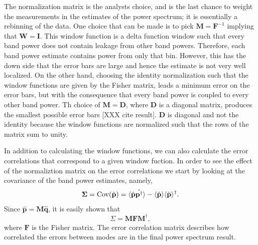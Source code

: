 \documentclass[twocolumn,numberedappendix]{emulateapj} \shorttitle{PSA64}
\newcommand{\phat}{\hat{\mathbf{p}}}
\newcommand{\qhat}{\hat{\mathbf{q}}}
\begin{document}
%
The normalization matrix is the analysts choice, and is the last chance to
weight the measurements in the estimates of the power spectrum; it is
essentially a rebinning of the data. One choice that can be made is to pick
$\mathbf{M} = \mathbf{F}^{-1}$ implying that $\mathbf{W} = \mathbf{I}$. This
window function is a delta function window such that every band power does not
contain leakage from other band powers. Therefore, each band power estimate
contains power from only that bin. However, this has the down side that the
error bars are large and hence the estimate is not very well localized. On the
other hand, choosing the identity normalization such that the window functions
are given by the Fisher matrix, leads a minimum error on the error bars, but
with the consequence that every band power is coupled to every other band power.
Th choice of $\mathbf{M} = \mathbf{D}$, where $\mathbf{D}$ is a diagonal matrix,
produces the smallest possible error bars [XXX cite result]. $\mathbf{D}$ is
diagonal and not the identity because the window functions are normalized such
that the rows of the matrix sum to unity.  

In addition to calculating the window functions, we can also calculate the error
correlations that correspond to a given window fuction. In order to see the
effect of the normaliztion matrix on the error correlations we start by looking
at the covariance of the band power estimates, namely, 
\begin{equation}\label{eqn:err_cov}
    \boldsymbol \Sigma = \text{Cov}(\hat{\mathbf{p}}) = \expval{\hat{\mathbf{p}}\hat{\mathbf{p}^{\dagger}}} -
             \expval{\hat{\mathbf{p}}}\expval{\hat{\mathbf{p}}}^{\dagger}.
\end{equation}
Since $\phat = \mathbf{M}\qhat$, it is easily shown that 
\begin{equation}
    \Sigma = \mathbf{M}\mathbf{F}\mathbf{M}^{\dagger},
\end{equation}
where $\mathbf{F}$ is the Fisher matrix. The error correlation matrix describes
how correlated the errors between modes are in the final power spectrum result.
\end{document}
